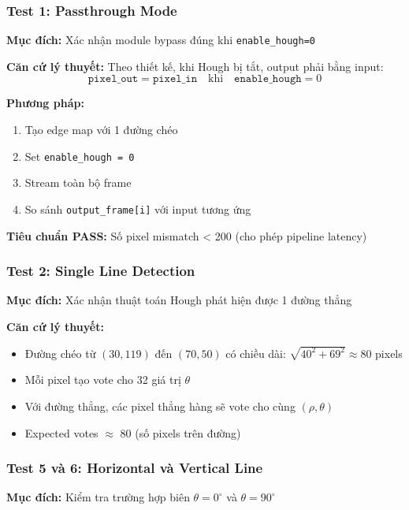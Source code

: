 \documentclass[12pt,a4paper]{article}
\begin{document}
\subsubsection{Test 1: Passthrough Mode}

\textbf{Mục đích:} Xác nhận module bypass đúng khi \texttt{enable\_hough=0}

\textbf{Căn cứ lý thuyết:} Theo thiết kế, khi Hough bị tắt, output phải bằng input:
\begin{equation}
    \texttt{pixel\_out} = \texttt{pixel\_in} \quad \text{khi} \quad \texttt{enable\_hough} = 0
\end{equation}

\textbf{Phương pháp:}
\begin{enumerate}
    \item Tạo edge map với 1 đường chéo
    \item Set \texttt{enable\_hough = 0}
    \item Stream toàn bộ frame
    \item So sánh \texttt{output\_frame[i]} với input tương ứng
\end{enumerate}

\textbf{Tiêu chuẩn PASS:} Số pixel mismatch < 200 (cho phép pipeline latency)

\subsubsection{Test 2: Single Line Detection}

\textbf{Mục đích:} Xác nhận thuật toán Hough phát hiện được 1 đường thẳng

\textbf{Căn cứ lý thuyết:} 
\begin{itemize}
    \item Đường chéo từ $(30, 119)$ đến $(70, 50)$ có chiều dài: $\sqrt{40^2 + 69^2} \approx 80$ pixels
    \item Mỗi pixel tạo vote cho 32 giá trị $\theta$
    \item Với đường thẳng, các pixel thẳng hàng sẽ vote cho cùng $(\rho, \theta)$
    \item Expected votes $\approx$ 80 (số pixels trên đường)
\end{itemize}

\subsubsection{Test 5 và 6: Horizontal và Vertical Line}

\textbf{Mục đích:} Kiểm tra trường hợp biên $\theta = 0^\circ$ và $\theta = 90^\circ$
\end{document}
